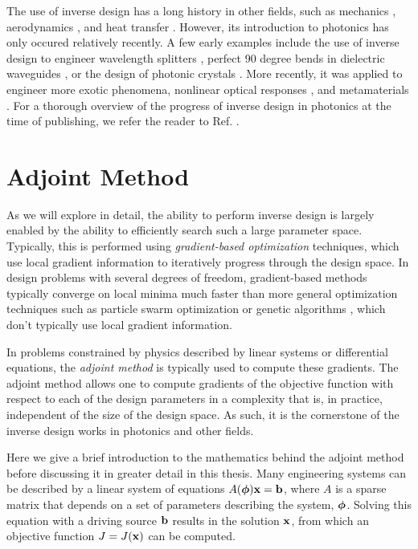 The use of inverse design has a long history in other fields, such as mechanics \cite{tanaka_inverse_1998}, aerodynamics \cite{jameson_aerodynamic_nodate}, and heat transfer \cite{ozisik_inverse_2018}.
However, its introduction to photonics has only occured relatively recently.
A few early examples include the use of inverse design to engineer wavelength splitters \cite{piggott_inverse_2015}, perfect 90 degree bends in dielectric waveguides \cite{jensen_topology_2005}, or the design of photonic crystals \cite{borel_topology_2004}.
More recently, it was applied to engineer more exotic phenomena, nonlinear optical responses \cite{lin_cavity-enhanced_2016}, and metamaterials \cite{sigmund_systematic_2009}.
For a thorough overview of the progress of inverse design in photonics at the time of publishing, we refer the reader to Ref. .

\section{Adjoint Method}

As we will explore in detail, the ability to perform inverse design is largely enabled by the ability to efficiently search such a large parameter space.
Typically, this is performed using \textit{gradient-based optimization} techniques, which use local gradient information to iteratively progress through the design space.
In design problems with several degrees of freedom, gradient-based methods typically converge on local minima much faster than more general optimization techniques such as particle swarm optimization \cite{noauthor_particle_nodate} or genetic algorithms \cite{whitley_genetic_1994}, which don't typically use local gradient information.

In problems constrained by physics described by linear systems or differential equations, the \textit{adjoint method} is typically used to compute these gradients.
The adjoint method allows one to compute gradients of the objective function with respect to each of the design parameters in a complexity that is, in practice, independent of the size of the design space.
As such, it is the cornerstone of the inverse design works in photonics and other fields.

Here we give a brief introduction to the mathematics behind the adjoint method before discussing it in greater detail in this thesis.
Many engineering systems can be described by a linear system of equations $A(\bm{\phi}) \mathbf{x} = \mathbf{b}$, where $A$ is a sparse matrix that depends on a set of parameters describing the system, $\bm{\phi}$.
Solving this equation with a driving source $\mathbf{b}$ results in the solution $\mathbf{x}$, from which an objective function $J=J(\mathbf{x})$ can be computed.

